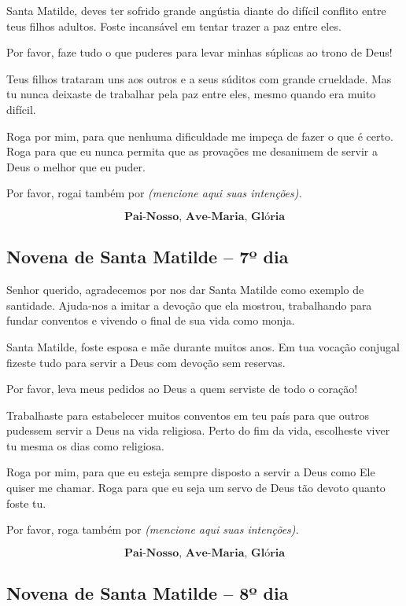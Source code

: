 \documentclass[a4paper,14pt]{extarticle} \usepackage[utf8]{inputenc}
\begin{document}
Santa Matilde, deves ter sofrido grande angústia diante do difícil conflito entre teus filhos adultos. Foste incansável em tentar trazer a paz entre eles.

Por favor, faze tudo o que puderes para levar minhas súplicas ao trono de Deus!

Teus filhos trataram uns aos outros e a seus súditos com grande crueldade. Mas tu nunca deixaste de trabalhar pela paz entre eles, mesmo quando era muito difícil.

Roga por mim, para que nenhuma dificuldade me impeça de fazer o que é certo. Roga para que eu nunca permita que as provações me desanimem de servir a Deus o melhor que eu puder.

Por favor, rogai também por \textit{(mencione aqui suas intenções).}

\[\textbf{Pai-Nosso, Ave-Maria, Glória}\]


\subsection{Novena de Santa Matilde – 7º dia}



Senhor querido, agradecemos por nos dar Santa Matilde como exemplo de santidade. Ajuda-nos a imitar a devoção que ela mostrou, trabalhando para fundar conventos e vivendo o final de sua vida como monja.

Santa Matilde, foste esposa e mãe durante muitos anos. Em tua vocação conjugal fizeste tudo para servir a Deus com devoção sem reservas.

Por favor, leva meus pedidos ao Deus a quem serviste de todo o coração!

Trabalhaste para estabelecer muitos conventos em teu país para que outros pudessem servir a Deus na vida religiosa. Perto do fim da vida, escolheste viver tu mesma os dias como religiosa.

Roga por mim, para que eu esteja sempre disposto a servir a Deus como Ele quiser me chamar. Roga para que eu seja um servo de Deus tão devoto quanto foste tu.

Por favor, roga também por \textit{(mencione aqui suas intenções).}

\[\textbf{Pai-Nosso, Ave-Maria, Glória}\]


\subsection{Novena de Santa Matilde – 8º dia}
\end{document}
